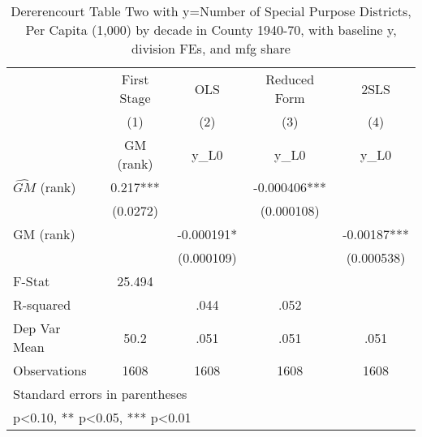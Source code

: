 \begin{table}[htbp]\centering
\def\sym#1{\ifmmode^{#1}\else\(^{#1}\)\fi}
\caption{Dererencourt Table Two with y=Number of Special Purpose Districts, Per Capita (1,000) by decade in County 1940-70, with baseline y, division FEs, and mfg share}
\begin{tabular}{l*{4}{c}}
\toprule
                    & First Stage   &         OLS   &Reduced Form   &        2SLS   \\
                    &\multicolumn{1}{c}{(1)}&\multicolumn{1}{c}{(2)}&\multicolumn{1}{c}{(3)}&\multicolumn{1}{c}{(4)}\\
                    &\multicolumn{1}{c}{GM  (rank)}&\multicolumn{1}{c}{y\_L0}&\multicolumn{1}{c}{y\_L0}&\multicolumn{1}{c}{y\_L0}\\
\midrule
$\hat{GM}$ (rank)   &       0.217***&               &   -0.000406***&               \\
                    &    (0.0272)   &               &  (0.000108)   &               \\
\addlinespace
GM  (rank)          &               &   -0.000191*  &               &    -0.00187***\\
                    &               &  (0.000109)   &               &  (0.000538)   \\
\midrule
F-Stat              &      25.494   &               &               &               \\
R-squared           &               &        .044   &        .052   &               \\
Dep Var Mean        &        50.2   &        .051   &        .051   &        .051   \\
Observations        &        1608   &        1608   &        1608   &        1608   \\
\bottomrule
\multicolumn{5}{l}{\footnotesize Standard errors in parentheses}\\
\multicolumn{5}{l}{\footnotesize * p<0.10, ** p<0.05, *** p<0.01}\\
\end{tabular}
\end{table}
